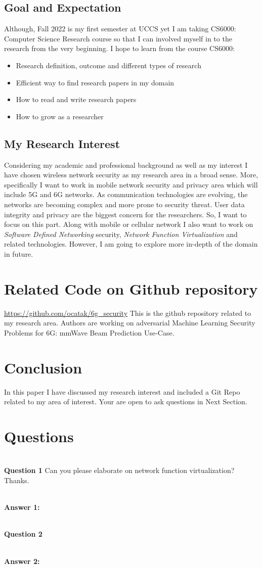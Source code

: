 \documentclass[journal]{IEEEtran}
\begin{document}
\subsection{Goal and Expectation}
Although, Fall 2022 is my first semester at UCCS yet I am taking CS6000: Computer Science Research course so that I can involved myself in to the research from the very beginning. I hope to learn from the course CS6000:
\begin{itemize}
    \item Research definition, outcome and different types of research
    \item Efficient way to find research papers in my domain
    \item How to read and write research papers
    \item How to grow as a researcher
\end{itemize}

\subsection{My Research Interest}
Considering my academic and professional background as well as my interest I have chosen wireless network security as my research area in a broad sense. More, specifically I want to work in mobile network security and privacy area which will include 5G and 6G networks. As communication technologies are evolving, the networks are becoming complex and more prone to security threat. User data integrity and privacy are the biggest concern for the researchers. So, I want to focus on this part. Along with mobile or cellular network I also want to work on \textit{Software Defined Networking} security, \textit{Network Function Virtualization} and related technologies. However, I am going to explore more in-depth of the domain in future. 

\section{Related Code on Github  repository}
\url{https://github.com/ocatak/6g_security} This is the github repository related to my research area. Authors are working on adversarial Machine Learning Security Problems for 6G: mmWave Beam Prediction Use-Case.

\section{Conclusion}
In this paper I have discussed my research interest and included a Git Repo related to my area of interest. Your are open to ask questions in Next Section.


\section{Questions}
\\
\textbf{Question 1}
Can you please elaborate on network function virtualization? Thanks.

\\
\textbf{Answer 1:}


\\
\textbf{Question 2}


\\
\textbf{Answer 2:}
\end{document}
